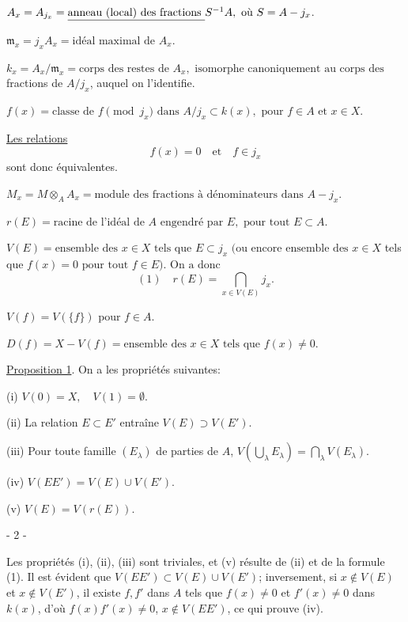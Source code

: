 $A_x = A_{j_x} = \text{\underline{anneau (local) des fractions }} S^{-1}A, \text{ où } S = A - j_x$.

$\mathfrak{m}_x = j_x A_x = \text{idéal maximal de } A_x$.

$k_x = A_x / \mathfrak{m}_x = \text{corps des restes de } A_x, \text{ isomorphe canoniquement au corps des}$
\phantom{$k_x =$} fractions de $A/j_x$, auquel on l'identifie.

$f(x) = \text{classe de } f \pmod{j_x} \text{ dans } A/j_x \subset k(x), \text{ pour } f \in A \text{ et } x \in X$.

\noindent \underline{Les relations}
$$f(x) = 0 \quad \text{et} \quad f \in j_x$$
sont donc équivalentes.

$M_x = M \otimes_A A_x = \text{module des fractions à dénominateurs dans } A - j_x$.

$r(E) = \text{racine de l'idéal de } A \text{ engendré par } E, \text{ pour tout } E \subset A$.

$V(E) = \text{ensemble des } x \in X \text{ tels que } E \subset j_x \text{ (ou encore ensemble des } x \in X$
\phantom{$V(E) =$} tels que $f(x) = 0 \text{ pour tout } f \in E \text{). On a donc}$
$$(1) \quad r(E) = \bigcap_{x \in V(E)} j_x.$$

$V(f) = V(\{f\}) \text{ pour } f \in A$.

$D(f) = X - V(f) = \text{ensemble des } x \in X \text{ tels que } f(x) \neq 0$.

\noindent \underline{Proposition 1}. On a les propriétés suivantes:

(i) $V(0) = X, \quad V(1) = \emptyset$.

(ii) La relation $E \subset E'$ entraîne $V(E) \supset V(E')$.

(iii) Pour toute famille $(E_\lambda)$ de parties de $A$, $V(\bigcup_\lambda E_\lambda) = \bigcap_\lambda V(E_\lambda)$.

(iv) $V(EE') = V(E) \cup V(E')$.

(v) $V(E) = V(r(E))$.

\newpage


- 2 -

Les propriétés (i), (ii), (iii) sont triviales, et (v) résulte de (ii) et de la formule (1). Il est évident que $V(EE') \subset V(E) \cup V(E')$; inversement, si $x \notin V(E)$ et $x \notin V(E')$, il existe $f, f'$ dans $A$ tels que $f(x) \neq 0$ et $f'(x) \neq 0$ dans $k(x)$, d'où $f(x)f'(x) \neq 0$, $x \notin V(EE')$, ce qui prouve (iv).

